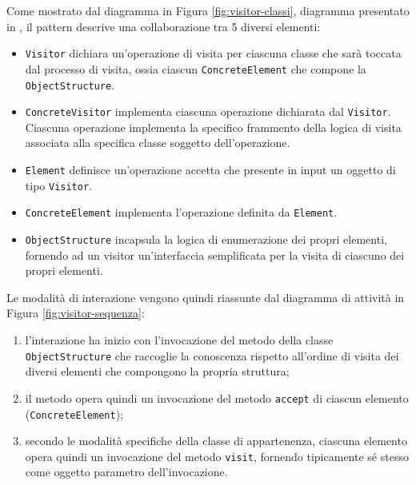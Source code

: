 Come mostrato dal diagramma in Figura \ref{fig:visitor-classi}, diagramma
presentato in \cite{gamma1995design}, il pattern descrive una collaborazione tra
5 diversi elementi:

\begin{itemize}

\item \texttt{Visitor} dichiara un'operazione di visita per ciascuna classe
che sarà toccata dal processo di visita, ossia ciascun
\texttt{ConcreteElement} che compone la \texttt{ObjectStructure}.

\item \texttt{ConcreteVisitor} implementa ciascuna operazione dichiarata dal
\texttt{Visitor}. Ciascuna operazione implementa la specifico frammento della
logica di visita associata alla specifica classe soggetto dell'operazione.

\item \texttt{Element} definisce un'operazione accetta che presente in input un
oggetto di tipo \texttt{Visitor}.

\item \texttt{ConcreteElement} implementa l'operazione definita da
\texttt{Element}.

\item \texttt{ObjectStructure} incapsula la logica di enumerazione dei propri
elementi, fornendo ad un visitor un'interfaccia semplificata per la visita di
ciascuno dei propri elementi.

\end{itemize}

Le modalità di interazione vengono quindi riassunte dal diagramma di attività
in Figura \ref{fig:visitor-sequenza}:

\begin{enumerate}

\item l'interazione ha inizio con l'invocazione del metodo della classe
\texttt{ObjectStructure} che raccoglie la conoscenza rispetto all'ordine di
visita dei diversi elementi che compongono la propria struttura;

\item il metodo opera quindi un invocazione del metodo \texttt{accept} di
ciascun elemento (\texttt{ConcreteElement});

\item secondo le modalità specifiche della classe di appartenenza, ciascuna
elemento opera quindi un invocazione del metodo \texttt{visit}, fornendo
tipicamente sé stesso come oggetto parametro dell'invocazione.

\end{enumerate}

